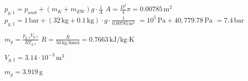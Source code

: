 \( p_{g,1} = p_{amb} + (m_K + m_{EW}) g \cdot \frac{1}{A} \)  
\( A = \frac{D^2}{4} \pi = 0.00785 \, \text{m}^2 \)  
\( p_{g,1} = 1 \, \text{bar} + (32 \, \text{kg} + 0.1 \, \text{kg}) \cdot g \cdot \frac{1}{0.00785 \, \text{m}^2} \)  
\( = 10^5 \, \text{Pa} + 40,779.78 \, \text{Pa} \)  
\( = 7.4 \, \text{bar} \)  

\( m_g = \frac{p_{g,1} V_{g,1}}{R T_{g,1}} \)  
\( R = \frac{\bar{R}}{50 \, \text{kg/kmol}} = 0.7663 \, \text{kJ/kg·K} \)  

\( V_{g,1} = 3.14 \cdot 10^{-3} \, \text{m}^3 \)  

\( m_g = 3.919 \, \text{g} \)